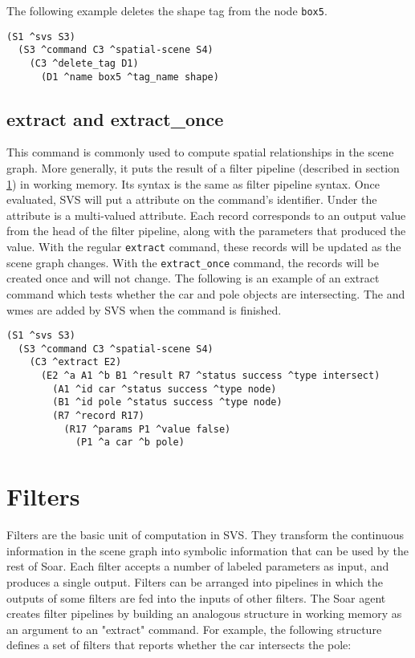 The following example deletes the shape tag from the node \texttt{box5}.
\begin{verbatim}
(S1 ^svs S3)
  (S3 ^command C3 ^spatial-scene S4)
    (C3 ^delete_tag D1)
      (D1 ^name box5 ^tag_name shape)
\end{verbatim}

\subsection{extract and extract\_once}
This command is commonly used to compute spatial relationships in the scene graph.
More generally, it puts the result of a filter pipeline (described in section \ref{sec:svs-filters}) in working memory.
Its syntax is the same as filter pipeline syntax.
Once evaluated, SVS will put a  attribute on the command's identifier.
Under the  attribute is a multi-valued  attribute.
Each record corresponds to an output value from the head of the filter pipeline, along with the parameters that produced the value.
With the regular \texttt{extract} command, these records will be updated as the scene graph
changes. With the \texttt{extract\_once} command, the records will be created once
and will not change. 
The following is an example of an extract command which tests whether the 
car and pole objects are intersecting. The  and  wmes are 
added by SVS when the command is finished. 

\begin{verbatim}
(S1 ^svs S3)
  (S3 ^command C3 ^spatial-scene S4)
    (C3 ^extract E2)
      (E2 ^a A1 ^b B1 ^result R7 ^status success ^type intersect)
        (A1 ^id car ^status success ^type node)
        (B1 ^id pole ^status success ^type node)
        (R7 ^record R17)
          (R17 ^params P1 ^value false)
            (P1 ^a car ^b pole)
\end{verbatim}

\section{Filters}
\label{sec:svs-filters}

Filters are the basic unit of computation in SVS.
They transform the continuous information in the scene graph into symbolic information that can be used by the rest of Soar.
Each filter accepts a number of labeled parameters as input, and produces a single output.
Filters can be arranged into pipelines in which the outputs of some filters are fed into the inputs of other filters.
The Soar agent creates filter pipelines by building an analogous structure in working memory as an argument to an "extract" command.
For example, the following structure defines a set of filters that reports whether the car intersects the pole:

